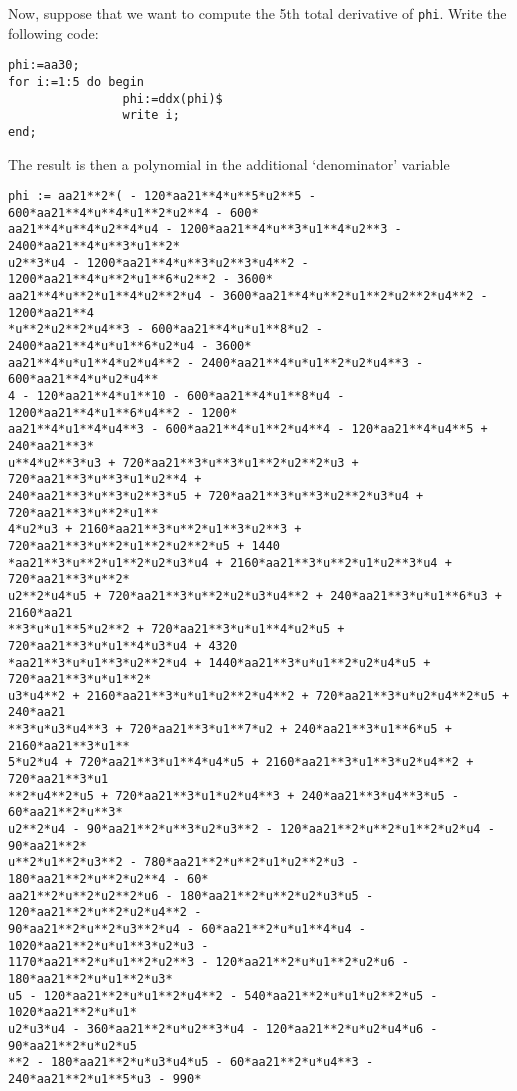 \documentclass[12pt]{amsart}
\theoremstyle{definition}
\begin{document}
Now, suppose that we want to compute the 5th total derivative of
\texttt{phi}. Write the following code:
\begin{verbatim}
phi:=aa30;
for i:=1:5 do begin
                phi:=ddx(phi)$
                write i;
end;
\end{verbatim}
The result is then a polynomial in the additional `denominator' variable
\begin{verbatim}
phi := aa21**2*( - 120*aa21**4*u**5*u2**5 - 600*aa21**4*u**4*u1**2*u2**4 - 600*
aa21**4*u**4*u2**4*u4 - 1200*aa21**4*u**3*u1**4*u2**3 - 2400*aa21**4*u**3*u1**2*
u2**3*u4 - 1200*aa21**4*u**3*u2**3*u4**2 - 1200*aa21**4*u**2*u1**6*u2**2 - 3600*
aa21**4*u**2*u1**4*u2**2*u4 - 3600*aa21**4*u**2*u1**2*u2**2*u4**2 - 1200*aa21**4
*u**2*u2**2*u4**3 - 600*aa21**4*u*u1**8*u2 - 2400*aa21**4*u*u1**6*u2*u4 - 3600*
aa21**4*u*u1**4*u2*u4**2 - 2400*aa21**4*u*u1**2*u2*u4**3 - 600*aa21**4*u*u2*u4**
4 - 120*aa21**4*u1**10 - 600*aa21**4*u1**8*u4 - 1200*aa21**4*u1**6*u4**2 - 1200*
aa21**4*u1**4*u4**3 - 600*aa21**4*u1**2*u4**4 - 120*aa21**4*u4**5 + 240*aa21**3*
u**4*u2**3*u3 + 720*aa21**3*u**3*u1**2*u2**2*u3 + 720*aa21**3*u**3*u1*u2**4 + 
240*aa21**3*u**3*u2**3*u5 + 720*aa21**3*u**3*u2**2*u3*u4 + 720*aa21**3*u**2*u1**
4*u2*u3 + 2160*aa21**3*u**2*u1**3*u2**3 + 720*aa21**3*u**2*u1**2*u2**2*u5 + 1440
*aa21**3*u**2*u1**2*u2*u3*u4 + 2160*aa21**3*u**2*u1*u2**3*u4 + 720*aa21**3*u**2*
u2**2*u4*u5 + 720*aa21**3*u**2*u2*u3*u4**2 + 240*aa21**3*u*u1**6*u3 + 2160*aa21
**3*u*u1**5*u2**2 + 720*aa21**3*u*u1**4*u2*u5 + 720*aa21**3*u*u1**4*u3*u4 + 4320
*aa21**3*u*u1**3*u2**2*u4 + 1440*aa21**3*u*u1**2*u2*u4*u5 + 720*aa21**3*u*u1**2*
u3*u4**2 + 2160*aa21**3*u*u1*u2**2*u4**2 + 720*aa21**3*u*u2*u4**2*u5 + 240*aa21
**3*u*u3*u4**3 + 720*aa21**3*u1**7*u2 + 240*aa21**3*u1**6*u5 + 2160*aa21**3*u1**
5*u2*u4 + 720*aa21**3*u1**4*u4*u5 + 2160*aa21**3*u1**3*u2*u4**2 + 720*aa21**3*u1
**2*u4**2*u5 + 720*aa21**3*u1*u2*u4**3 + 240*aa21**3*u4**3*u5 - 60*aa21**2*u**3*
u2**2*u4 - 90*aa21**2*u**3*u2*u3**2 - 120*aa21**2*u**2*u1**2*u2*u4 - 90*aa21**2*
u**2*u1**2*u3**2 - 780*aa21**2*u**2*u1*u2**2*u3 - 180*aa21**2*u**2*u2**4 - 60*
aa21**2*u**2*u2**2*u6 - 180*aa21**2*u**2*u2*u3*u5 - 120*aa21**2*u**2*u2*u4**2 - 
90*aa21**2*u**2*u3**2*u4 - 60*aa21**2*u*u1**4*u4 - 1020*aa21**2*u*u1**3*u2*u3 - 
1170*aa21**2*u*u1**2*u2**3 - 120*aa21**2*u*u1**2*u2*u6 - 180*aa21**2*u*u1**2*u3*
u5 - 120*aa21**2*u*u1**2*u4**2 - 540*aa21**2*u*u1*u2**2*u5 - 1020*aa21**2*u*u1*
u2*u3*u4 - 360*aa21**2*u*u2**3*u4 - 120*aa21**2*u*u2*u4*u6 - 90*aa21**2*u*u2*u5
**2 - 180*aa21**2*u*u3*u4*u5 - 60*aa21**2*u*u4**3 - 240*aa21**2*u1**5*u3 - 990*

\end{verbatim}
\end{document}
